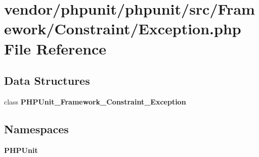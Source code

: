 \section{vendor/phpunit/phpunit/src/\+Framework/\+Constraint/\+Exception.php File Reference}
\label{phpunit_2phpunit_2src_2_framework_2_constraint_2_exception_8php}
\subsection*{Data Structures}
\begin{DoxyCompactItemize}
\item 
class {\bf P\+H\+P\+Unit\+\_\+\+Framework\+\_\+\+Constraint\+\_\+\+Exception}
\end{DoxyCompactItemize}
\subsection*{Namespaces}
\begin{DoxyCompactItemize}
\item 
 {\bf P\+H\+P\+Unit}
\end{DoxyCompactItemize}
